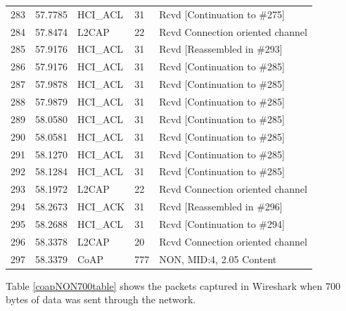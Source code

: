 \begin{table}[]
\begin{tabular}{lllll}
283    & 57.7785 & HCI\_ACL & 31     & Rcvd {[}Continuation to \#275{]} \\
284    & 57.8474 & L2CAP    & 22     & Rcvd Connection oriented channel \\
285    & 57.9176 & HCI\_ACL & 31     & Rcvd {[}Reassembled in \#293{]}  \\
286    & 57.9176 & HCI\_ACL & 31     & Rcvd {[}Continuation to \#285{]} \\
287    & 57.9878 & HCI\_ACL & 31     & Rcvd {[}Continuation to \#285{]} \\
288    & 57.9879 & HCI\_ACL & 31     & Rcvd {[}Continuation to \#285{]} \\
289    & 58.0580 & HCI\_ACL & 31     & Rcvd {[}Continuation to \#285{]} \\
290    & 58.0581 & HCI\_ACL & 31     & Rcvd {[}Continuation to \#285{]} \\
291    & 58.1270 & HCI\_ACL & 31     & Rcvd {[}Continuation to \#285{]} \\
292    & 58.1284 & HCI\_ACL & 31     & Rcvd {[}Continuation to \#285{]} \\
293    & 58.1972 & L2CAP    & 22     & Rcvd Connection oriented channel \\
294    & 58.2673 & HCI\_ACK & 31     & Rcvd {[}Reassembled in \#296{]}  \\
295    & 58.2688 & HCI\_ACL & 31     & Rcvd {[}Continuation to \#294{]} \\
296    & 58.3378 & L2CAP    & 20     & Rcvd Connection oriented channel \\
297    & 58.3379 & CoAP     & 777    & NON, MID:4, 2.05 Content         \\ \hline
\end{tabular}
\end{table}

Table \ref{coapNON700table} shows the packets captured in Wireshark when 700 bytes of data was sent through the network. 







